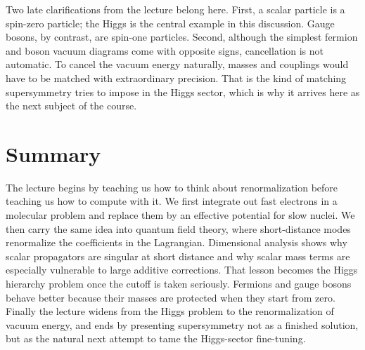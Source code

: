 Two late clarifications from the lecture belong here. First, a scalar particle is a spin-zero particle; the Higgs is the central example in this discussion. Gauge bosons, by contrast, are spin-one particles. Second, although the simplest fermion and boson vacuum diagrams come with opposite signs, cancellation is not automatic. To cancel the vacuum energy naturally, masses and couplings would have to be matched with extraordinary precision. That is the kind of matching supersymmetry tries to impose in the Higgs sector, which is why it arrives here as the next subject of the course.

\section{Summary}

The lecture begins by teaching us how to think about renormalization before teaching us how to compute with it. We first integrate out fast electrons in a molecular problem and replace them by an effective potential for slow nuclei. We then carry the same idea into quantum field theory, where short-distance modes renormalize the coefficients in the Lagrangian. Dimensional analysis shows why scalar propagators are singular at short distance and why scalar mass terms are especially vulnerable to large additive corrections. That lesson becomes the Higgs hierarchy problem once the cutoff is taken seriously. Fermions and gauge bosons behave better because their masses are protected when they start from zero. Finally the lecture widens from the Higgs problem to the renormalization of vacuum energy, and ends by presenting supersymmetry not as a finished solution, but as the natural next attempt to tame the Higgs-sector fine-tuning.
